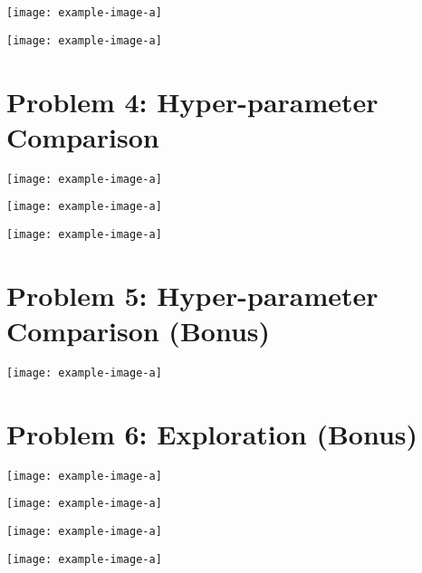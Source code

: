 \documentclass{article}
\begin{document}
\begin{answer}[title=Plot,height=9.5cm,width=\linewidth]
\centering
\texttt{[image: example-image-a]}
\end{answer}

\begin{answer}[title=Plot,height=9.5cm,width=\linewidth]
\centering
\texttt{[image: example-image-a]}
\end{answer}

\section{Problem 4: Hyper-parameter Comparison}
\begin{answer}[title=Plot,height=9.5cm,width=\linewidth]
\centering
\texttt{[image: example-image-a]}
\end{answer}

\begin{answer}[title=Plot,height=9.5cm,width=\linewidth]
\centering
\texttt{[image: example-image-a]}
\end{answer}

\begin{answer}[title=Plot,height=9.5cm,width=\linewidth]
\centering
\texttt{[image: example-image-a]}
\end{answer}


\section{Problem 5: Hyper-parameter Comparison (Bonus)}
\begin{answer}[title=Plot,height=9.5cm,width=\linewidth]
\centering
\texttt{[image: example-image-a]}
\end{answer}


\section{Problem 6: Exploration (Bonus)}
\begin{answer}[title=Plot,height=9.5cm,width=\linewidth]
\centering
\texttt{[image: example-image-a]}
\end{answer}

\begin{answer}[title=Plot,height=9.5cm,width=\linewidth]
\centering
\texttt{[image: example-image-a]}
\end{answer}

\begin{answer}[title=Plot,height=9.5cm,width=\linewidth]
\centering
\texttt{[image: example-image-a]}
\end{answer}

\begin{answer}[title=Plot,height=9.5cm,width=\linewidth]
\centering
\texttt{[image: example-image-a]}
\end{answer}
\end{document}
